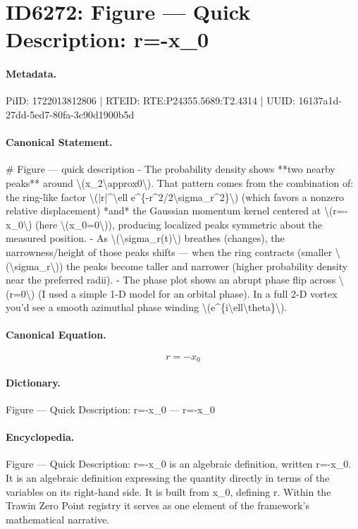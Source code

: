 \section*{ID6272: Figure — Quick Description: r=-x\_0}
\paragraph{Metadata.}
PiID: 1722013812806 | RTEID: RTE:P24355.5689:T2.4314 | UUID: 16137a1d-27dd-5ed7-80fa-3c90d1900b5d

\paragraph{Canonical Statement.}
\# Figure — quick description - The probability density shows **two nearby peaks** around \textbackslash{}(x\_2\textbackslash{}approx0\textbackslash{}). That pattern comes from the combination of: the ring-like factor \textbackslash{}(|r|\textasciicircum{}\textbackslash{}ell e\textasciicircum{}\{-r\textasciicircum{}2/2\textbackslash{}sigma\_r\textasciicircum{}2\}\textbackslash{}) (which favors a nonzero relative displacement) *and* the Gaussian momentum kernel centered at \textbackslash{}(r=-x\_0\textbackslash{}) (here \textbackslash{}(x\_0=0\textbackslash{})), producing localized peaks symmetric about the measured position. - As \textbackslash{}(\textbackslash{}sigma\_r(t)\textbackslash{}) breathes (changes), the narrowness/height of those peaks shifts — when the ring contracts (smaller \textbackslash{}(\textbackslash{}sigma\_r\textbackslash{})) the peaks become taller and narrower (higher probability density near the preferred radii). - The phase plot shows an abrupt phase flip across \textbackslash{}(r=0\textbackslash{}) (I used a simple 1-D model for an orbital phase). In a full 2-D vortex you’d see a smooth azimuthal phase winding \textbackslash{}(e\textasciicircum{}\{i\textbackslash{}ell\textbackslash{}theta\}\textbackslash{}).

\paragraph{Canonical Equation.}
\[
r=-x_0
\]

\paragraph{Dictionary.}
Figure — Quick Description: r=-x\_0 — r=-x\_0

\paragraph{Encyclopedia.}
Figure — Quick Description: r=-x\_0 is an algebraic definition, written r=-x\_0. It is an algebraic definition expressing the quantity directly in terms of the variables on its right-hand side. It is built from x\_0, defining r. Within the Trawin Zero Point registry it serves as one element of the framework's mathematical narrative.

